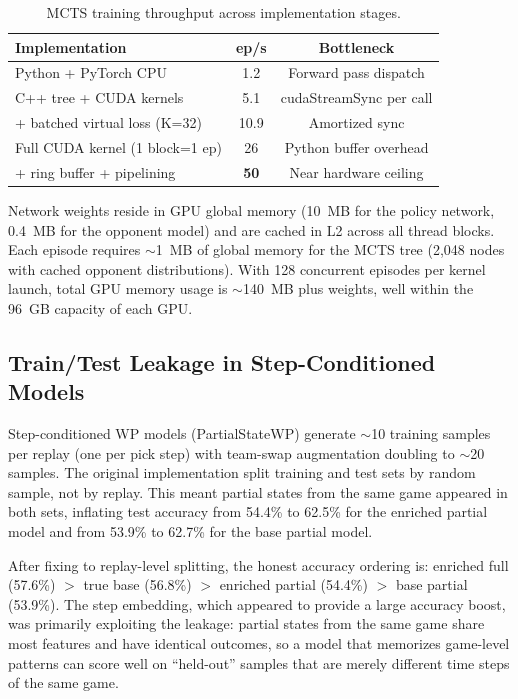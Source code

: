 \documentclass[journal]{IEEEtran}
\begin{document}
\begin{table}[t]
\centering
\caption{MCTS training throughput across implementation stages.}
\label{tab:throughput}
\begin{tabular}{lcc}
\toprule
Implementation & ep/s & Bottleneck \\
\midrule
Python + PyTorch CPU & 1.2 & Forward pass dispatch \\
C++ tree + CUDA kernels & 5.1 & cudaStreamSync per call \\
+ batched virtual loss (K=32) & 10.9 & Amortized sync \\
Full CUDA kernel (1 block=1 ep) & 26 & Python buffer overhead \\
+ ring buffer + pipelining & \textbf{50} & Near hardware ceiling \\
\bottomrule
\end{tabular}
\end{table}

Network weights reside in GPU global memory (10~MB for the policy network, 0.4~MB for the opponent model) and are cached in L2 across all thread blocks. Each episode requires $\sim$1~MB of global memory for the MCTS tree (2,048 nodes with cached opponent distributions). With 128 concurrent episodes per kernel launch, total GPU memory usage is $\sim$140~MB plus weights, well within the 96~GB capacity of each GPU.

\subsection{Train/Test Leakage in Step-Conditioned Models}
\label{sec:leakage}

Step-conditioned WP models (PartialStateWP) generate $\sim$10 training samples per replay (one per pick step) with team-swap augmentation doubling to $\sim$20 samples. The original implementation split training and test sets by random sample, not by replay. This meant partial states from the same game appeared in both sets, inflating test accuracy from 54.4\% to 62.5\% for the enriched partial model and from 53.9\% to 62.7\% for the base partial model.

After fixing to replay-level splitting, the honest accuracy ordering is: enriched full (57.6\%) $>$ true base (56.8\%) $>$ enriched partial (54.4\%) $>$ base partial (53.9\%). The step embedding, which appeared to provide a large accuracy boost, was primarily exploiting the leakage: partial states from the same game share most features and have identical outcomes, so a model that memorizes game-level patterns can score well on ``held-out'' samples that are merely different time steps of the same game.
\end{document}

